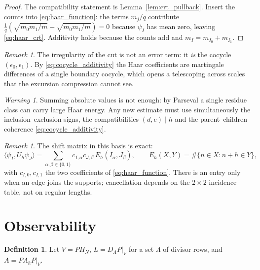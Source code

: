 \documentclass[11pt]{amsart}
\numberwithin{equation}{section}
\theoremstyle{plain}
\theoremstyle{definition}
\newtheorem{definition}[theorem]{Definition}
\theoremstyle{remark}
\newtheorem{remark}[theorem]{Remark}
\newtheorem{warning}[theorem]{Warning}
\begin{document}
\begin{proof}
The compatibility statement is Lemma~\ref{lem:crt_pullback}. Insert the
counts into \eqref{eq:haar_function}: the terms $m_j/q$ contribute
$\frac1q(\sqrt{m_0m_1/m}-\sqrt{m_0m_1/m})=0$ because $\psi_I$ has mean
zero, leaving \eqref{eq:haar_crt}. Additivity holds because the counts
add and $m_I=m_{I_0}+m_{I_1}$.
\end{proof}

\begin{remark}
\label{rem:irregularity_is_data}
The irregularity of the cut is not an error term: it \emph{is} the
cocycle $(\epsilon_0,\epsilon_1)$. By \eqref{eq:cocycle_additivity} the
Haar coefficients are martingale differences of a single boundary
cocycle, which opens a telescoping across scales that the excursion
compression cannot see.
\end{remark}

\begin{warning}
\label{warn:parseval_nogo}
Summing absolute values is not enough: by Parseval a single residue class
can carry large Haar energy. Any new estimate must use simultaneously
the inclusion--exclusion signs, the compatibilities $(d,e)\mid h$ and the
parent--children coherence \eqref{eq:cocycle_additivity}.
\end{warning}

\begin{remark}
\label{rem:shift_matrix_in_haar}
The shift matrix in this basis is exact:
\begin{equation}
\langle\psi_I,U_h\psi_J\rangle
=\sum_{\alpha,\beta\in\{0,1\}}c_{I,\alpha}c_{J,\beta}\,
E_h(I_\alpha,J_\beta),
\qquad E_h(X,Y)=\#\{n\in X:n+h\in Y\},
\label{eq:shift_in_haar}
\end{equation}
with $c_{I,0},c_{I,1}$ the two coefficients of
\eqref{eq:haar_function}. There is an entry only when an edge joins the
supports; cancellation depends on the $2\times2$ incidence table, not on
regular lengths.
\end{remark}

\section{Observability}
\label{sec:observability}

\begin{definition}
\label{def:observability_setup}
Let $V=PH_N$, $L=D_\Lambda P|_V$ for a set $\Lambda$ of divisor rows,
and $A=PA_hP|_V$.
\end{definition}
\end{document}
